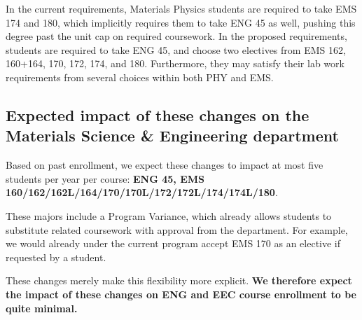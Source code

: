 \documentclass[12pt]{article}
\begin{document}
In the current requirements, Materials Physics students are required
to take EMS 174 and 180, which implicitly requires them to take ENG 45
as well, pushing this degree past the unit cap on required coursework.
In the proposed requirements, students are required to take ENG 45,
and choose two electives from EMS 162, 160+164, 170, 172, 174, and
180.  Furthermore, they may satisfy their lab work requirements from
several choices within both PHY and EMS.

\subsection{Expected impact of these changes on the Materials Science \& Engineering department}


Based on past enrollment, we expect these changes to impact at most
five students per year per course: {\bf ENG 45, EMS
  160/162/162L/164/170/170L/172/172L/174/174L/180}.

These majors include a Program Variance, which already allows students
to substitute related coursework with approval from the department.
For example, we would already under the current program accept EMS 170
as an elective if requested by a student.

These changes merely make this flexibility more explicit.  {\bf We
  therefore expect the impact of these changes on ENG and EEC course
  enrollment to be quite minimal.}
\end{document}
